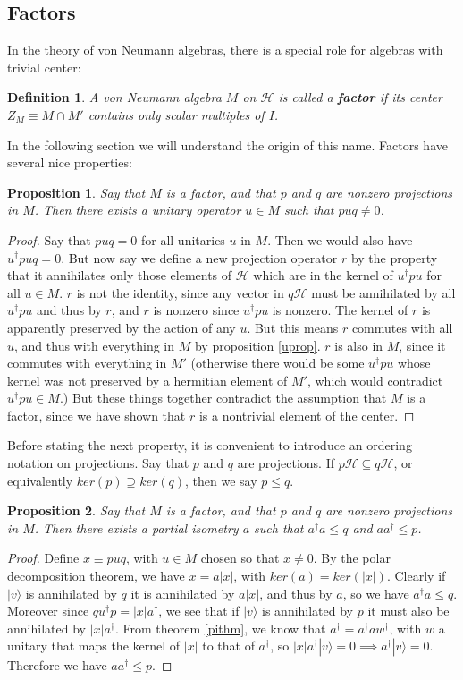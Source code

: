 \documentclass[12pt]{article}
\newcommand{\ran}{\rangle}
\newcommand{\Hh}{\mathcal{H}}
\newtheorem{mydef}{Definition}[section]
\newtheorem{prop}{Proposition}[section]
\begin{document}
\subsection{Factors}
In the theory of von Neumann algebras, there is a special role for algebras with trivial center:
\begin{mydef}
A von Neumann algebra $M$ on $\Hh$ is called a \textbf{factor} if its center $Z_M\equiv M\cap M'$ contains only scalar multiples of $I$.
\end{mydef}
In the following section we will understand the origin of this name.  Factors have several nice properties:
\begin{prop}
Say that $M$ is a factor, and that $p$ and $q$ are nonzero projections in $M$.  Then there exists a unitary operator $u\in M$ such that $puq\neq 0$.  
\end{prop}
\begin{proof}
Say that $puq=0$ for all unitaries $u$ in $M$.  Then we would also have $u^\dagger p uq=0$.  But now say we define a new projection operator $r$ by the property that it annihilates only those elements of $\Hh$ which are in the kernel of $u^\dagger p u$ for all $u\in M$.  $r$ is not the identity, since any vector in $q\Hh$ must be annihilated by all $u^\dagger p u$ and thus by $r$, and $r$ is nonzero since $u^\dagger p u$ is nonzero.   The kernel of $r$ is apparently preserved by the action of any $u$.  But this means $r$ commutes with all $u$, and thus with everything in $M$ by proposition \eqref{uprop}.  $r$ is also in $M$, since it commutes with everything in $M'$ (otherwise there would be some $u^\dagger p u$ whose kernel was not preserved by a hermitian element of $M'$, which would contradict $u^\dagger p u\in M$.)  But these things together contradict the assumption that $M$ is a factor, since we have shown that $r$ is a nontrivial element of the center. 
\end{proof}
Before stating the next property, it is convenient to introduce an ordering notation on projections.  Say that $p$ and $q$ are projections. If $p\Hh\subseteq q \Hh$, or equivalently $ker(p)\supseteq ker(q)$, then we say $p\leq q$.
\begin{prop}\label{aprop}
Say that $M$ is a factor, and that $p$ and $q$ are nonzero projections in $M$.  Then there exists a partial isometry $a$ such that $a^\dagger a\leq q$ and $aa^\dagger \leq p$.
\end{prop} 
\begin{proof}
Define $x\equiv puq$, with $u\in M$ chosen so that $x\neq 0$.  By the polar decomposition theorem, we have $x=a|x|$, with $ker(a)=ker(|x|)$.  Clearly if $|v\ran$ is annihilated by $q$ it is annihilated by $a|x|$, and thus by $a$, so we have $a^\dagger a \leq q$.  Moreover since $qu^\dagger p=|x|a^\dagger$, we see that if $|v\ran$ is annihilated by $p$ it must also be annihilated by $|x|a^\dagger$.  From theorem \eqref{pithm}, we know that $a^\dagger=a^\dagger a w^\dagger$, with $w$ a unitary that maps the kernel of $|x|$ to that of $a^\dagger$, so $|x|a^\dagger|v\ran=0\implies a^\dagger|v\ran=0$.  Therefore we have $aa^\dagger \leq p$.
\end{proof}
\end{document}
